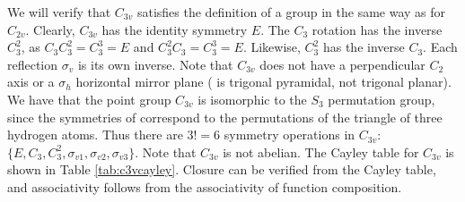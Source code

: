 \documentclass{article}
\begin{document}
    We will verify that $C_{3v}$ satisfies the definition of a group in the same way as for $C_{2v}$. Clearly, $C_{3v}$ has the identity symmetry $E$. The $C_3$ rotation has the inverse $C_3^2$, as $C_3C_3^2=C_3^3=E$ and $C_3^2C_3=C_3^3=E$. Likewise, $C_3^2$ has the inverse $C_3$. Each reflection $\sigma_{v}$ is its own inverse. Note that $C_{3v}$ does not have a perpendicular $C_2$ axis or a $\sigma_h$ horizontal mirror plane ( is trigonal pyramidal, not trigonal planar). We have that the point group $C_{3v}$ is isomorphic to the $S_3$ permutation group, since the symmetries of  correspond to the permutations of the triangle of three hydrogen atoms. Thus there are $3!=6$ symmetry operations in $C_{3v}$: $\{E, C_3, C_3^2, \sigma_{v1}, \sigma_{v2}, \sigma_{v3}\}$. Note that $C_{3v}$ is not abelian. The Cayley table for $C_{3v}$ is shown in Table \ref{tab:c3vcayley}. Closure can be verified from the Cayley table, and associativity follows from the associativity of function composition.
\end{document}
